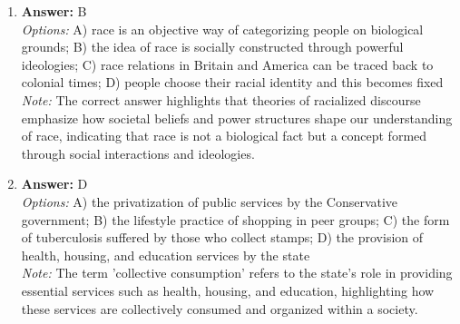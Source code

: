 \documentclass[12pt]{article}
\begin{document}
\begin{enumerate}[label=\arabic*.]
\item \textbf{Answer:} B
\\ \textit{Options:} A) race is an objective way of categorizing people on biological grounds; B) the idea of race is socially constructed through powerful ideologies; C) race relations in Britain and America can be traced back to colonial times; D) people choose their racial identity and this becomes fixed
\\ \textit{Note:} The correct answer highlights that theories of racialized discourse emphasize how societal beliefs and power structures shape our understanding of race, indicating that race is not a biological fact but a concept formed through social interactions and ideologies.
\item \textbf{Answer:} D
\\ \textit{Options:} A) the privatization of public services by the Conservative government; B) the lifestyle practice of shopping in peer groups; C) the form of tuberculosis suffered by those who collect stamps; D) the provision of health, housing, and education services by the state
\\ \textit{Note:} The term 'collective consumption' refers to the state's role in providing essential services such as health, housing, and education, highlighting how these services are collectively consumed and organized within a society.
\end{enumerate}
\end{document}
